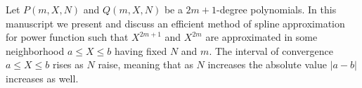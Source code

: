 ﻿Let $P(m, X, N)$ and $Q(m, X, N)$ be a $2m+1$-degree polynomials.
In this manuscript we present and discuss an efficient method of spline approximation
for power function such that $X^{2m+1}$ and $X^{2m}$
are approximated in some neighborhood $a \leq X \leq b$ having fixed $N$ and $m$.
The interval of convergence $a \leq X \leq b$ rises as $N$ raise, meaning that as $N$ increases
the absolute value $|a-b|$ increases as well.
